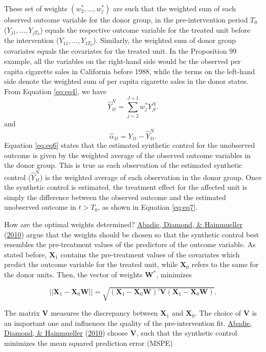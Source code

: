 \documentclass[12pt,nobind, a4paper]{reedthesis}
\begin{document}
 These set of weights \((w_{2}^{*},...,w_{j}^{*})\) are such that the weighted sum of each observed outcome variable for the donor group, in the pre-intervention period \(T_0\) (\(Y_{j1},..., Y_{jT_0}\)) equals the respective outcome variable for the treated unit before the intervention (\(Y_{11},...,Y_{1T_0}\)). Similarly, the weighted sum of donor group covariates equals the covariates for the treated unit. In the Proposition 99 example, all the variables on the right-hand side would be the observed per capita cigarette sales in California before 1988, while the terms on the left-hand side denote the weighted sum of per capita cigarette sales in the donor states. From Equation \eqref{eq:eq4}, we have
 \begin{equation}
 \hat{Y}^{N}_{1t}=\sum_{j=2}^{J+1}w^{*}_{j}Y^{N}_{jt}.
 \label{eq:eq6}
 \end{equation}
 and
 \begin{equation}
 \hat{\alpha}_{1t}={Y_{1t}}-\hat{Y}^{N}_{1t}.
 \label{eq:eq7}
 \end{equation}
 Equation \eqref{eq:eq6} states that the estimated synthetic control for the unobserved outcome is given by the weighted average of the observed outcome variables in the donor group. This is true as each observation of the estimated synthetic control (\(\hat{Y}^{N}_{1t}\)) is the weighted average of each observation in the donor group. Once the synthetic control is estimated, the treatment effect for the affected unit is simply the difference between the observed outcome and the estimated unobserved outcome in \(t>T_0\), as shown in Equation \eqref{eq:eq7}.
 \linebreak

 How are the optimal weights determined? \protect\hyperlink{ref-abadie_synthetic_2010}{Abadie, Diamond, \& Hainmueller} (\protect\hyperlink{ref-abadie_synthetic_2010}{2010}) argue that the weights should be chosen so that the synthetic control best resembles the pre-treatment values of the predictors of the outcome variable. As stated before, \(\mathbf{X}_1\) contains the pre-treatment values of the covariates which predict the outcome variable for the treated unit, while \(\mathbf{X}_0\) refers to the same for the donor units. Then, the vector of weights \(\mathbf{W^*}\), minimizes

 \[||\mathbf{X}_1-\mathbf{X}_{0}\mathbf{W}||=\sqrt{(\mathbf{X}_1-\mathbf{X}_{0} \mathbf{W})' \mathbf{V}(\mathbf{X}_1-\mathbf{X}_{0} \mathbf{W})}.\]

 The matrix \(\mathbf{V}\) measures the discrepancy between \(\mathbf{X}_1\) and \(\mathbf{X}_0\). The choice of \(\mathbf{V}\) is an important one and influences the quality of the pre-intervention fit. \protect\hyperlink{ref-abadie_synthetic_2010}{Abadie, Diamond, \& Hainmueller} (\protect\hyperlink{ref-abadie_synthetic_2010}{2010}) choose \(\mathbf{V}\), such that the synthetic control minimizes the mean squared prediction error (MSPE)
\end{document}
